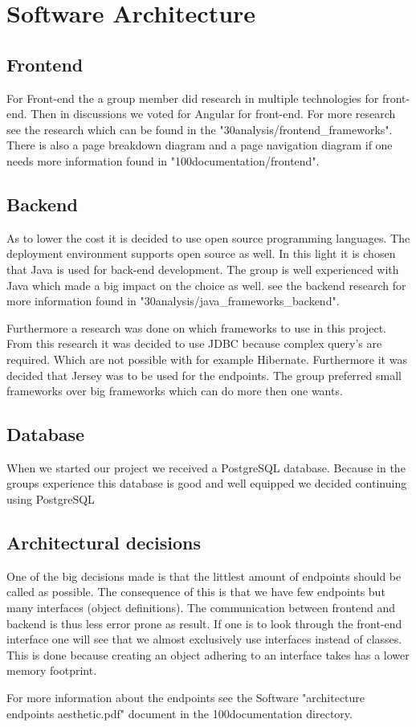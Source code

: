 
\chapter{Software Architecture}

\section{Frontend}

For Front-end the a group member did research in multiple technologies for front-end. Then in discussions we voted for Angular for front-end. For more research see the research which can be found in the "30analysis/frontend\_frameworks". There is also a page breakdown diagram and a page navigation diagram if one needs more information found in "100documentation/frontend".

\section{Backend}

As to lower the cost it is decided to use open source programming languages. The deployment environment supports open source as well. In this light it is chosen that Java is used for back-end development. The group is well experienced with Java which made a big impact on the choice as well. see the backend research for more information found in "30analysis/java\_frameworks\_backend".

Furthermore a research was done on which frameworks to use in this project. From this research it was decided to use JDBC because complex query's are required. Which are not possible with for example Hibernate. Furthermore it was decided that Jersey was to be used for the endpoints. The group preferred small frameworks over big frameworks which can do more then one wants.

\section{Database}

When we started our project we received a PostgreSQL database. Because in the groups experience this database is good and well equipped we decided continuing using PostgreSQL


\section{Architectural decisions}

One of the big decisions made is that the littlest amount of endpoints should be called as possible. The consequence of this is that we have few endpoints but many interfaces (object definitions). The communication between frontend and backend is thus less error prone as result. If one is to look through the front-end interface one will see that we almost exclusively use interfaces instead of classes. This is done because creating an object adhering to an interface takes has a lower memory footprint.

For more information about the endpoints see the Software "architecture endpoints aesthetic.pdf" document in the 100documentation directory.